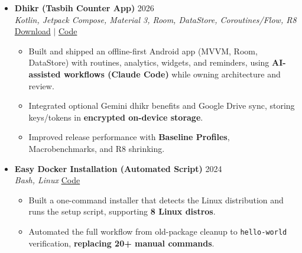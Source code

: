 \documentclass[a4paper]{article}
\newcommand{\resumeItem}[1]{
  \item\small{
    {#1 \vspace{-2pt}}
  }
}
\newcommand{\resumeItemListStart}{\begin{itemize}}
\newcommand{\resumeItemListEnd}{\end{itemize}\vspace{-5pt}}
\begin{document}
\begin{itemize}[leftmargin=0.15in, label={}, itemsep=6pt]
    \item
    \textbf{Dhikr (Tasbih Counter App)} \hfill 2026\\
    \small\textit{Kotlin, Jetpack Compose, Material 3, Room, DataStore, Coroutines/Flow, R8} \hfill
    \href{https://github.com/badhon495/Dhikr/releases}{Download} $|$
    \href{https://github.com/badhon495/Dhikr}{Code}
    \vspace{-5pt}
    \resumeItemListStart
      \resumeItem{Built and shipped an offline-first Android app (MVVM, Room, DataStore) with routines, analytics, widgets, and reminders, using \textbf{AI-assisted workflows (Claude Code)} while owning architecture and review.}
      \resumeItem{Integrated optional Gemini dhikr benefits and Google Drive sync, storing keys/tokens in \textbf{encrypted on-device storage}.}
      \resumeItem{Improved release performance with \textbf{Baseline Profiles}, Macrobenchmarks, and R8 shrinking.}
    \resumeItemListEnd

    \item
    \textbf{Easy Docker Installation (Automated Script)} \hfill 2024\\
    \small\textit{Bash, Linux} \hfill
    \href{https://github.com/badhon495/Easy_Docker_Installation}{Code}
    \vspace{-5pt}
    \resumeItemListStart
      \resumeItem{Built a one-command installer that detects the Linux distribution and runs the setup script, supporting \textbf{8 Linux distros}.}
      \resumeItem{Automated the full workflow from old-package cleanup to \texttt{hello-world} verification, \textbf{replacing 20+ manual commands}.}
    \resumeItemListEnd
    
  \end{itemize}




\end{document}
